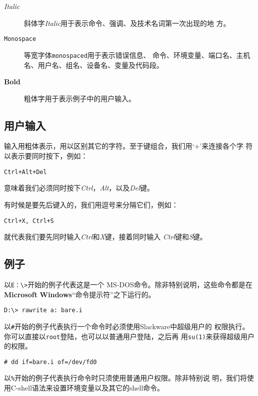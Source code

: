 \begin{description}
\item[\textit{Italic}] 斜体字\textit{Italic}用于表示命令、强调、及技术名词第一次出现的地
  方。
\item[\texttt{Monospace}] 等宽字体\texttt{monospaced}用于表示错误信息、
  命令、环境变量、端口名、主机名、用户名、组名、设备名、变量及代码段。
\item[\textbf{Bold}] 粗体字用于表示例子中的用户输入。
\end{description}

\subsection*{用户输入}
\label{sec:preface:conventions:userInput}

输入用粗体表示，用以区别其它的字符。至于键组合，我们用`+'来连接各个字
符以表示要同时按下，例如：
\begin{Verbatim}[frame=single]
Ctrl+Alt+Del
\end{Verbatim}
意味着我们必须同时按下\textit{Ctrl}，\textit{Alt}，以及\textit{Del}键。

有时候是要先后键入的，我们用逗号来分隔它们，例如：
\begin{Verbatim}[frame=single]
Ctrl+X, Ctrl+S
\end{Verbatim}
就代表我们要先同时输入\textit{Ctrl}和\textit{X}键，接着同时输入
\textit{Ctrl}键和\textit{S}键。

\subsection*{例子}
\label{sec:preface:conventions:examples}

以\texttt{E：\textbackslash{}\textgreater}开始的例子代表这是一个
MS-DOS\textregistered{}命令。除非特别说明，这些命令都是在
\textbf{Microsoft}\textregistered{}
\textbf{Windows}\textregistered{}``命令提示符''之下运行的。
\begin{Verbatim}[frame=single]
D:\> rawrite a: bare.i
\end{Verbatim}

以\texttt{\#}开始的例子代表执行一个命令时必须使用Slackware中超级用户的
权限执行。你可以直接以\texttt{root}登陆，也可以以普通用户登陆，之后再
用\texttt{su(1)}来获得超级用户的权限。
\begin{Verbatim}[frame=single]
# dd if=bare.i of=/dev/fd0
\end{Verbatim}

以\texttt{\%}开始的例子代表执行命令时只须使用普通用户权限。除非特别说
明，我们将使用C-shell语法来设置环境变量以及其它的shell命令。
\begin{Verbatim}[frame=single]
% top
\end{Verbatim}

